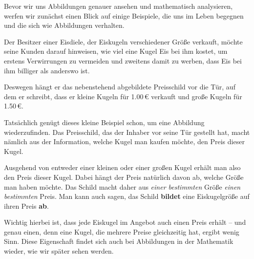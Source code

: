 \documentclass[../../main.tex]{subfiles}
\begin{document}
Bevor wir uns Abbildungen genauer ansehen und mathematisch analysieren, werfen wir zunächst einen Blick auf einige Beispiele, die uns im Leben begegnen und die sich wie Abbildungen verhalten.

\begin{example}{}
    Der Besitzer einer Eisdiele, der Eiskugeln verschiedener Größe verkauft, möchte seine Kunden darauf hinweisen, wie viel eine Kugel Eis bei ihm kostet, um erstens Verwirrungen zu vermeiden und zweitens damit zu werben, dass Eis bei ihm billiger als anderswo ist.
    
    Deswegen hängt er das nebenstehend abgebildete Preisschild vor die Tür, auf dem er schreibt, dass er kleine Kugeln für 1.00\,\euro{} verkauft und große Kugeln für 1.50\,\euro.
    
    Tatsächlich genügt dieses kleine Beispiel schon, um eine Abbildung wiederzufinden. Das Preisschild, das der Inhaber vor seine Tür gestellt hat, macht nämlich aus der Information, welche Kugel man kaufen möchte, den Preis dieser Kugel.
    
    Ausgehend von entweder einer kleinen oder einer großen Kugel erhält man also den Preis dieser Kugel. Dabei hängt der Preis natürlich davon ab, welche Größe man haben möchte. Das Schild macht daher aus \emph{einer bestimmten} Größe \emph{einen bestimmten} Preis. Man kann auch sagen, das Schild \textbf{bildet} eine Eiskugelgröße auf ihren Preis \textbf{ab}. 
    
    Wichtig hierbei ist, dass jede Eiskugel im Angebot auch einen Preis erhält -- und genau einen, denn eine Kugel, die mehrere Preise gleichzeitig hat, ergibt wenig Sinn. Diese Eigenschaft findet sich auch bei Abbildungen in der Mathematik wieder, wie wir später sehen werden.
\end{example}
\end{document}
